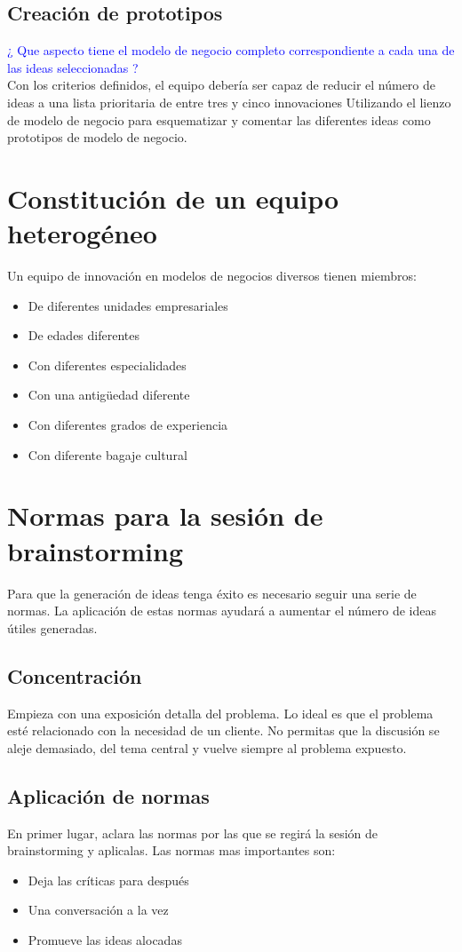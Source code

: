 \documentclass[11pt]{book}
\begin{document}
\subsection{Creación de prototipos}
\textcolor{blue}{ ¿ Que aspecto tiene el modelo de negocio completo correspondiente a cada una de las ideas seleccionadas ? }\\
Con los criterios definidos, el equipo debería ser capaz de reducir el número de ideas a una lista prioritaria de entre tres y cinco innovaciones Utilizando el lienzo de modelo de negocio para esquematizar y comentar las diferentes ideas como prototipos de modelo de negocio.
\section{Constitución de un equipo heterogéneo}
Un equipo de innovación en modelos de negocios diversos tienen miembros:
\begin{itemize}
\item De diferentes unidades empresariales
\item De edades diferentes
\item Con diferentes especialidades
\item Con una antigüedad diferente
\item Con diferentes grados de experiencia
\item Con diferente bagaje cultural
\end{itemize}
\section{Normas para la sesión de brainstorming}
Para que la generación de ideas tenga éxito es necesario seguir una serie de normas. La aplicación de estas normas ayudará a aumentar el número de ideas útiles generadas.
\subsection{Concentración}
Empieza con una exposición detalla del problema. Lo ideal es que el problema esté relacionado con la necesidad de un cliente. No permitas que la discusión se aleje demasiado, del tema central y vuelve siempre al problema expuesto.
\subsection{Aplicación de normas}
En primer lugar, aclara las normas por las que se regirá la sesión de brainstorming y aplicalas. Las normas mas importantes son:\\
\begin{itemize}
\item Deja las críticas para después
\item Una conversación a la vez
\item Promueve las ideas alocadas
\end{itemize}
\end{document}
